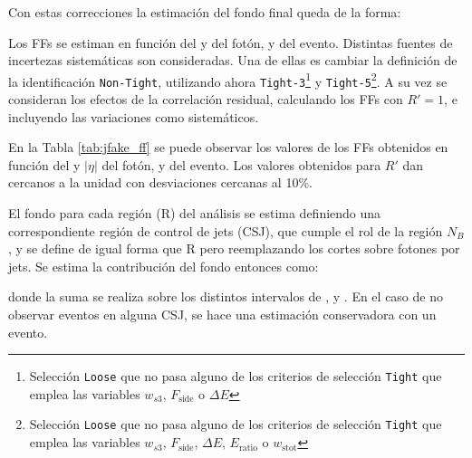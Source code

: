 Con estas correcciones la estimación del fondo final queda de la forma:

Los FFs se estiman en función del \pt y \absEta del fotón, y \met del evento. Distintas fuentes de incertezas sistemáticas son consideradas. 
Una de ellas es cambiar la definición de la identificación \texttt{Non-Tight}, utilizando ahora \texttt{Tight-3}\footnote{Selección \texttt{Loose} que no pasa alguno de los criterios de selección \texttt{Tight} que emplea las variables $w_{s3}$, $F_{\text{side}}$ o $\Delta E$} y \texttt{Tight-5}\footnote{Selección \texttt{Loose} que no pasa alguno de los criterios de selección \texttt{Tight} que emplea las variables $w_{s3}$, $F_{\text{side}}$, $\Delta E$, $E_{\text{ratio}}$ o $w_{\text{stot}}$}. A su vez se consideran los efectos de la correlación residual, calculando los FFs con $R'=1$, e incluyendo las variaciones como sistemáticos.

En la Tabla \ref{tab:jfake_ff} se puede observar los valores de los FFs obtenidos en función del \pt y $|\eta|$ del fotón, y \met del evento. Los valores obtenidos para $R'$ dan cercanos a la unidad con desviaciones cercanas al 10\%.

El fondo para cada región (R) del análisis se estima definiendo una correspondiente región de control de jets (CSJ), que cumple el rol de la región $N_B$, y se define de igual forma que R pero reemplazando los cortes sobre fotones por jets. Se estima la contribución del fondo entonces como:



donde la suma se realiza sobre los distintos intervalos de \absEta, \pt y \met.
En el caso de no observar eventos en alguna CSJ, se hace una estimación conservadora con un evento.




